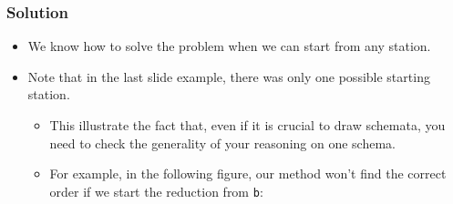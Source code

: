\documentclass{beamer}
\begin{document}
\begin{frame}%
\frametitle{Solution}



\begin{itemize}

\item We know how to solve the problem when we can start from any station.

\vspace{0.2cm}

\item<2-> Note that in the last slide example, there was only one possible starting station.
\vspace{0.1cm}
\begin{itemize}
\footnotesize
\item<2-> This illustrate the fact that, even if it is crucial to draw schemata, you need to check the generality of your reasoning
on one schema.
\vspace{0.1cm}
\item<3-> For example, in the following figure, our method won't find the correct order if we start the reduction from \texttt{b}:
\end{itemize}

\end{itemize}

\end{frame}
\end{document}

